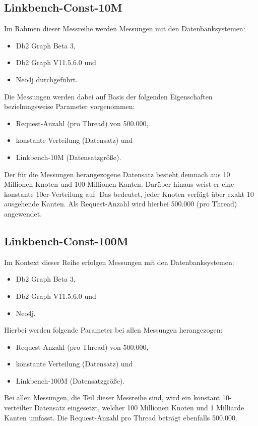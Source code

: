 \subsection{Linkbench-Const-10M}
Im Rahmen dieser Messreihe werden Messungen mit den Datenbanksystemen:
\begin{itemize}
    \item Db2 Graph Beta 3,
    \item Db2 Graph V11.5.6.0 und 
    \item Neo4j durchgeführt. 
\end{itemize}
Die Messungen werden dabei auf Basis der folgenden Eigenschaften beziehungsweise Parameter vorgenommen:
\begin{itemize}
    \item Request-Anzahl (pro Thread) von 500.000, 
    \item konstante Verteilung (Datensatz) und
    \item Linkbench-10M (Datensatzgröße).
\end{itemize}
Der für die Messungen herangezogene Datensatz besteht demnach aus 10 Millionen Knoten und 100 Millionen Kanten. Darüber hinaus weist er eine konstante 10er-Verteilung auf. Das bedeutet, jeder Knoten verfügt über exakt 10 ausgehende Kanten. Als Request-Anzahl wird hierbei 500.000 (pro Thread) angewendet.

\subsection{Linkbench-Const-100M}
Im Kontext dieser Reihe erfolgen Messungen mit den Datenbanksystemen:
\begin{itemize}
    \item Db2 Graph Beta 3,
    \item Db2 Graph V11.5.6.0 und 
    \item Neo4j. 
\end{itemize}

Hierbei werden folgende Parameter bei allen Messungen herangezogen:
\begin{itemize}
    \item Request-Anzahl (pro Thread) von 500.000, 
    \item konstante Verteilung (Datensatz) und
    \item Linkbench-100M (Datensatzgröße).
\end{itemize}
Bei allen Messungen, die Teil dieser Messreihe sind, wird ein konstant 10-verteilter Datensatz eingesetzt, welcher 100 Millionen Knoten und 1 Milliarde Kanten umfasst. Die Request-Anzahl pro Thread beträgt ebenfalls 500.000.

